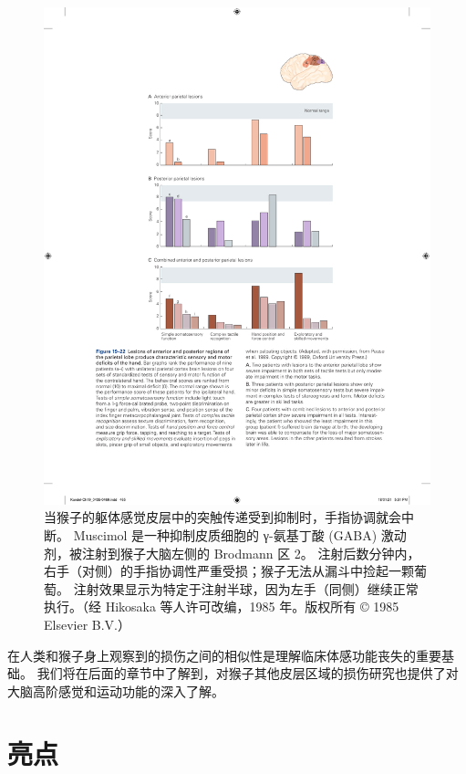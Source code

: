 \begin{figure}[htbp]
	\centering
	\includegraphics[width=1.0\linewidth]{chap19/fig_19_22}
	\caption{当猴子的躯体感觉皮层中的突触传递受到抑制时，手指协调就会中断。
		Muscimol 是一种抑制皮质细胞的 γ-氨基丁酸 (GABA) 激动剂，被注射到猴子大脑左侧的 Brodmann 区 2。
		注射后数分钟内，右手（对侧）的手指协调性严重受损；猴子无法从漏斗中捡起一颗葡萄。
		注射效果显示为特定于注射半球，因为左手（同侧）继续正常执行。（经 Hikosaka 等人许可改编，1985 年。版权所有 © 1985 Elsevier B.V.）}
	\label{fig:19_23}
\end{figure}


在人类和猴子身上观察到的损伤之间的相似性是理解临床体感功能丧失的重要基础。 
我们将在后面的章节中了解到，对猴子其他皮层区域的损伤研究也提供了对大脑高阶感觉和运动功能的深入了解。


\section{亮点}

